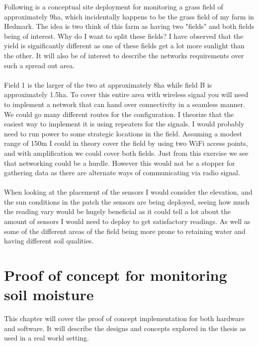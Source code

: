 \documentclass[]{uiophd}
\begin{document}
 Following is a conceptual site deployment for monitoring a grass field of approximately 9ha, which incidentally happens to be the grass field of my farm in Hedmark. The idea is two think of this farm as having two "fields" and both fields being of interest. Why do I want to split these fields? I have observed that the yield is significantly different as one of these fields get a lot more sunlight than the other. It will also be of interest to describe the networks requirements over such a spread out area.
 \\\\
 Field 1 is the larger of the two at approximately 8ha while field B is approximately 1.5ha. To cover this entire area with wireless signal you will need to implement a network that can hand over connectivity in a seamless manner. We could go many different routes for the configuration. I theorize that the easiest way to implement it is using repeaters for the signals. I would probably need to run power to some strategic locations in the field. Assuming a modest range of 150m I could in theory cover the field by using two WiFi access points, and with amplification we could cover both fields. Just from this exercise we see that networking could be a hurdle. However this would not be a stopper for gathering data as there are alternate ways of communicating via radio signal.
 \\\\
 When looking at the placement of the sensors I would consider the elevation, and the sun conditions in the patch the sensors are being deployed, seeing how much the reading vary would be hugely beneficial as it could tell a lot about the amount of sensors I would need to deploy to get satisfactory readings. As well as some of the different areas of the field being more prone to retaining water and having different soil qualities. 
 
\chapter{Proof of concept for monitoring soil moisture}

This chapter will cover the proof of concept implementation for both hardware and software. It will describe the designs and concepts explored in the thesis as used in a real world setting.
\end{document}
